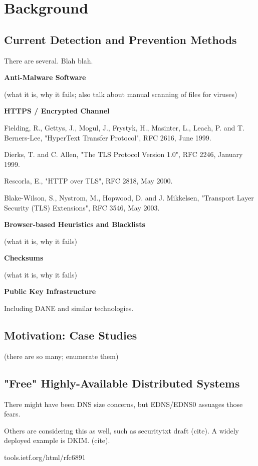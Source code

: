 \section{Background} \label{sec:background}


\subsection{Current Detection and Prevention Methods}

There are several. Blah blah.

\textbf{Anti-Malware Software}

(what it is, why it fails; also talk about manual scanning of files for
viruses)

\textbf{HTTPS / Encrypted Channel}

Fielding, R., Gettys, J., Mogul, J., Frystyk, H., Masinter, L., Leach, P. and T.
Berners-Lee, "HyperText Transfer Protocol", RFC 2616, June 1999.

Dierks, T. and C. Allen, "The TLS Protocol Version 1.0", RFC 2246, January 1999.

Rescorla, E., "HTTP over TLS", RFC 2818, May 2000.

Blake-Wilson, S., Nystrom, M., Hopwood, D. and J. Mikkelsen, "Transport Layer
Security (TLS) Extensions", RFC 3546, May 2003.

\textbf{Browser-based Heuristics and Blacklists}

(what it is, why it fails)

\textbf{Checksums}

(what it is, why it fails)

\textbf{Public Key Infrastructure}

Including DANE and similar technologies.

\subsection{Motivation: Case Studies}

(there are so many; enumerate them)

\subsection{"Free" Highly-Available Distributed Systems}

There might have been DNS size concerns, but EDNS/EDNS0 assuages those fears.

Others are considering this as well, such as securitytxt draft (cite). A widely
deployed example is DKIM. (cite).

tools.ietf.org/html/rfc6891
